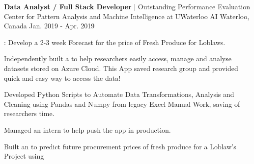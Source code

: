\begin{cventries}
  \cventry
    {\textbf{Data Analyst / Full Stack Developer} | Outstanding Performance Evaluation} %
    {Center for Pattern Analysis and Machine Intelligence at UWaterloo AI} %
    {Waterloo, Canada} %
    {Jan. 2019 - Apr. 2019} %
    {
      \begin{cvitems} %
        \item {: Develop a 2-3 week Forecast for the price of Fresh Produce for Loblaws.}
        \item {Independently built a  to help researchers easily access, manage and analyse datasets stored on Azure Cloud. This App saved research group  and provided quick and easy way to access the data!}
        \item {Developed Python Scripts to Automate Data Transformations, Analysis and Cleaning using Pandas and Numpy from legacy Excel Manual Work, saving  of researchers time.}
        \item {Managed an intern to help push the app in production.}
		\item {Built an  to predict future procurement prices of fresh produce for a Loblaw’s Project using }
      \end{cvitems}
    }
\end{cventries}
